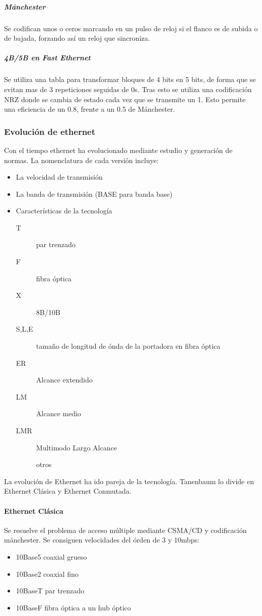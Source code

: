             \subparagraph{Mánchester} %
                Se codifican unos o ceros marcando en un pulso de reloj si el flanco es de subida o de bajada, forzando así un reloj que sincroniza.

            \subparagraph{4B/5B en Fast Ethernet} %
                Se utiliza una tabla para transformar bloques de 4 bits en 5 bits, de forma que se evitan mas de 3 repeticiones seguidas de 0s. Tras esto se utiliza una codificación NRZ donde se cambia de estado cada vez que se transmite un 1. Esto permite una eficiencia de un 0.8, frente a un 0.5 de Mánchester.

    \subsubsection{Evolución de ethernet} %
        Con el tiempo ethernet ha evolucionado mediante estudio y generación de normas. La nomenclatura de cada versión incluye:
        \begin{itemize}
            \item La velocidad de transmisión
            \item La banda de transmisión (BASE para banda base)
            \item Características de la tecnología \begin{description}
                \item[T] par trenzado
                \item[F] fibra óptica
                \item[X] 8B/10B
                \item[S,L,E] tamaño de longitud de ónda de la portadora en fibra óptica
                \item[ER] Alcance extendido
                \item[LM] Alcance medio
                \item[LMR] Multimodo Largo Alcance
                \item[] otros
            \end{description}
        \end{itemize}

        La evolución de Ethernet ha ido pareja de la tecnología. Tanenbaum lo divide en Ethernet Clásica y Ethernet Conmutada.

        \paragraph{Ethernet Clásica} %
            Se resuelve el problema de acceso múltiple mediante CSMA/CD y codificación mánchester. Se consiguen velocidades del órden de 3 y 10mbps:
            \begin{itemize}
                \item 10Base5 coaxial grueso
                \item 10Base2 coaxial fino
                \item 10BaseT par trenzado
                \item 10BaseF fibra óptica a un hub óptico
            \end{itemize}

